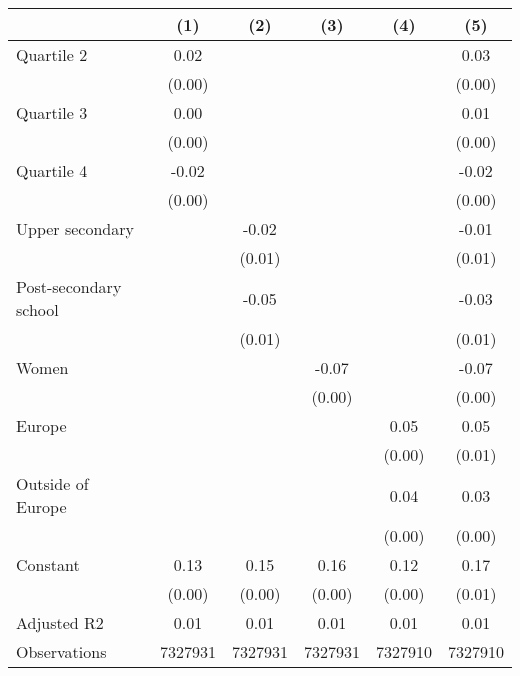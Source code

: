 
\begin{tabular}{@{}l*{5}{S[table-format={-}2.2{\tnote{***}}]}@{}}
\toprule
{} & {(1)} & {(2)} & {(3)} & {(4)} & {(5)}\tabularnewline%
\midrule
Quartile 2 & 0.02\tnote{***} &  &  &  & 0.03\tnote{***}\tabularnewline%
 & (0.00) &  &  &  & \vphantom{2} (0.00)\tabularnewline%
Quartile 3 & 0.00 &  &  &  & 0.01\tnote{**}\tabularnewline%
 & (0.00) &  &  &  & \vphantom{1} (0.00)\tabularnewline%
Quartile 4 & -0.02\tnote{***} &  &  &  & -0.02\tnote{***}\tabularnewline%
 & (0.00) &  &  &  & (0.00)\tabularnewline%
Upper secondary &  & -0.02\tnote{***} &  &  & -0.01\tnote{*}\tabularnewline%
 &  & (0.01) &  &  & \vphantom{1} (0.01)\tabularnewline%
Post-secondary school &  & -0.05\tnote{***} &  &  & -0.03\tnote{***}\tabularnewline%
 &  & (0.01) &  &  & (0.01)\tabularnewline%
Women &  &  & -0.07\tnote{***} &  & -0.07\tnote{***}\tabularnewline%
 &  &  & (0.00) &  & (0.00)\tabularnewline%
Europe &  &  &  & 0.05\tnote{***} & 0.05\tnote{***}\tabularnewline%
 &  &  &  & (0.00) & (0.01)\tabularnewline%
Outside of Europe &  &  &  & 0.04\tnote{***} & 0.03\tnote{***}\tabularnewline%
 &  &  &  & (0.00) & (0.00)\tabularnewline%
Constant & 0.13\tnote{***} & 0.15\tnote{***} & 0.16\tnote{***} & 0.12\tnote{***} & 0.17\tnote{***}\tabularnewline%
 & (0.00) & (0.00) & (0.00) & (0.00) & (0.01)\tabularnewline%
\midrule
Adjusted R2 & 0.01 & 0.01 & 0.01 & 0.01 & 0.01\tabularnewline%
Observations & {\num{7327931}} & {\num{7327931}} & {\num{7327931}} & {\num{7327910}} & {\num{7327910}}\tabularnewline%
\bottomrule
\end{tabular}
